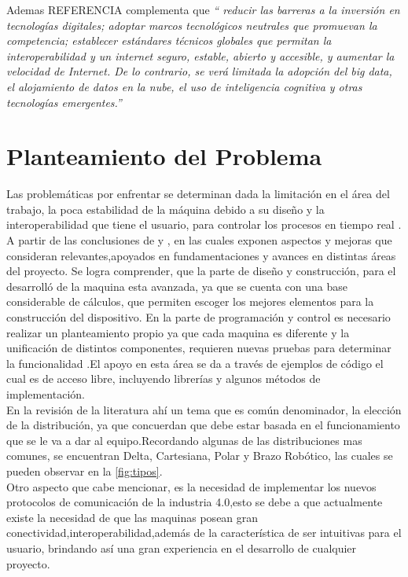 Ademas \citep{}REFERENCIA complementa que \textit{“ reducir las barreras a la inversión en tecnologías digitales; adoptar marcos tecnológicos neutrales que promuevan la competencia; establecer estándares técnicos globales que permitan la interoperabilidad y un internet seguro, estable, abierto y accesible, y aumentar la velocidad de Internet. De lo contrario, se verá limitada la adopción del big data, el alojamiento de datos en la nube, el uso de inteligencia cognitiva y otras tecnologías emergentes.''}\\

\newpage
\section{Planteamiento del Problema}\label{planteamiento}

Las problemáticas por enfrentar se determinan dada la limitación en el área del trabajo, la poca estabilidad de la máquina debido a su diseño y la interoperabilidad que tiene el usuario, para controlar los procesos en tiempo real . \\

A partir de las conclusiones de \citep{rodriguez} y \citep{fernandez}, en las cuales exponen aspectos y mejoras que consideran relevantes,apoyados en fundamentaciones y avances en distintas áreas del proyecto. Se logra comprender, que la parte de diseño y construcción, para el desarrolló de la maquina esta avanzada, ya que se cuenta con una base considerable de cálculos, que permiten escoger los mejores elementos para la construcción del dispositivo. En la parte de programación y control es necesario realizar un planteamiento propio ya que cada maquina es diferente y la unificación de distintos componentes, requieren nuevas pruebas para determinar la funcionalidad .El apoyo en esta área se da a través de ejemplos de código el cual es de acceso libre, incluyendo librerías y algunos métodos de implementación.\\ 

En la revisión de la literatura ahí un tema que es común denominador, la elección de la distribución, ya que concuerdan que debe estar basada en el funcionamiento que se le va a dar al equipo.Recordando algunas de las distribuciones mas comunes, se encuentran Delta, Cartesiana, Polar y Brazo Robótico, las cuales se pueden observar en la \autoref{fig:tipos}.\\

Otro aspecto que cabe mencionar, es la necesidad de implementar los nuevos protocolos de comunicación de la industria 4.0,esto se debe a que actualmente existe la necesidad de que las maquinas posean  gran conectividad,interoperabilidad,además de la característica de ser intuitivas para el usuario, brindando así una gran experiencia en el desarrollo de cualquier proyecto.\\

